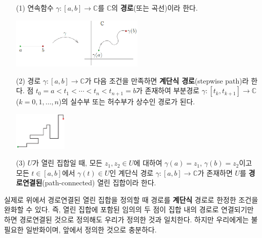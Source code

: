 \begin{saltdefinition}{}{} \label{def-1-1}
\begin{itemize}
\item[(1)] 연속함수 $\gamma:[a,b] \to \mathbb C$를 $\mathbb C$의 \textbf{경로}(또는 곡선)이라 한다.
\begin{center}
\includegraphics[width=0.5\textwidth]{./SaltChapter/figs/fig-1-0-2}
\end{center}
\item[(2)] 경로 $\gamma:[a,b] \to \mathbb C$가 다음 조건을 만족하면 
\textbf{계단식 경로}(stepwise path)라 한다.
점 $t_0 = a < t_1 < \cdots < t_n < t_{n+1} = b$가 존재하여
부분경로 $\gamma: [t_k, t_{k+1}] \to \mathbb C$ ($k=0,1,\ldots, n$)의
실수부 또는 허수부가 상수인 경로가 된다.
\begin{center}
\includegraphics[width=0.2\textwidth]{./SaltChapter/figs/fig-1-0-3}
\end{center}
\item[(3)] $U$가 열린 집합일 때,  모든 $z_1, z_2\in U$에 대하여
$\gamma(a)=z_1$, $\gamma(b)=z_2$이고 모든 $t\in[a,b]$에서 $\gamma(t)\in U$인
계단식 경로 $\gamma: [a,b] \to \mathbb C$가 존재하면
$U$를 \textbf{경로연결된}(path-connected) 열린 집합이라 한다.
\end{itemize}
\end{saltdefinition}

실제로 위에서 경로연결된 열린 집합을 정의할 때 경로를 {\bf 계단식} 경로로 한정한 조건을 
완화할 수 있다. 즉, 열린 집합에 포함된 임의의 두 점이 집합 내의 경로로 연결되기만 하면
경로연결된 것으로 정의해도
우리가 정의한 것과 일치한다.
하지만 우리에게는 불필요한 일반화이며, 앞에서 정의한 것으로 충분하다.

